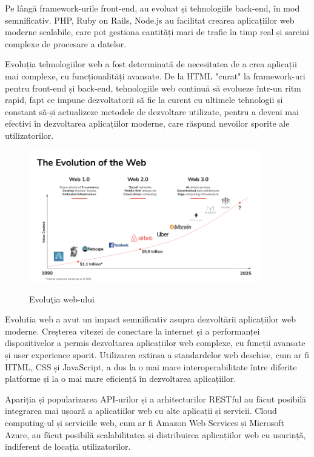 \documentclass[12pt, a4paper]{report}
\begin{document}
Pe lângă framework-urile front-end, au evoluat și tehnologiile back-end, în mod semnificativ. PHP, Ruby on Rails, Node.js au facilitat crearea aplicațiilor web moderne scalabile, care pot gestiona cantități mari de trafic în timp real și sarcini complexe de procesare a datelor.

Evoluția tehnologiilor web a fost determinată de necesitatea de a crea aplicații mai complexe, cu funcționalități avansate. De la HTML "curat" la framework-uri pentru front-end și back-end, tehnologiile web continuă să evolueze într-un ritm rapid, fapt ce impune dezvoltatorii să fie la curent cu ultimele tehnologii și constant să-și actualizeze metodele de dezvoltare utilizate, pentru a deveni mai efectivi în dezvoltarea aplicațiilor moderne, care răspund nevoilor sporite ale utilizatorilor.

\begin{figure}[htbp]
	\centering
	\includegraphics[width=0.9\textwidth]{web-evolution.png} \label{fig:web-evolution}
	\caption{Evolu\c tia web-ului}
\end{figure}

Evolutia web a avut un impact semnificativ asupra dezvoltării aplicațiilor web moderne. Creșterea vitezei de conectare la internet și a performanței dispozitivelor a permis dezvoltarea aplicațiilor web complexe, cu funcții avansate și user experience sporit. Utilizarea extinsa a standardelor web deschise, cum ar fi HTML, CSS și JavaScript, a dus la o mai mare interoperabilitate între diferite platforme și la o mai mare eficiență în dezvoltarea aplicațiilor.

Apariția și popularizarea API-urilor și a arhitecturilor RESTful au făcut posibilă integrarea mai ușoară a aplicatiilor web cu alte aplicații și servicii. Cloud computing-ul și serviciile web, cum ar fi Amazon Web Services și Microsoft Azure, au făcut posibilă scalabilitatea și distribuirea aplicațiilor web cu usurință, indiferent de locația utilizatorilor.
\end{document}
